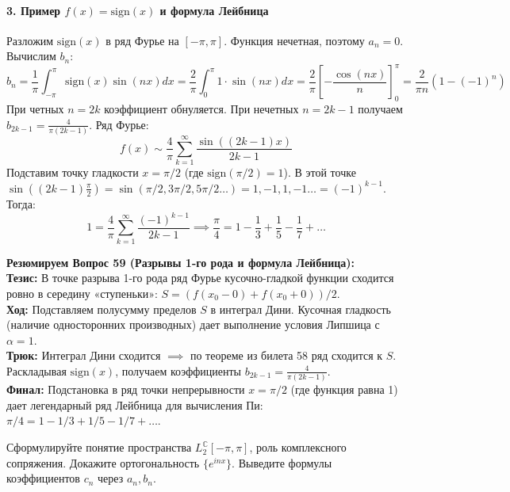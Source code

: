 \paragraph{3. Пример $f(x) = \text{sign}(x)$ и формула Лейбница}
Разложим $\text{sign}(x)$ в ряд Фурье на $[-\pi, \pi]$. Функция нечетная, поэтому $a_n = 0$.
Вычислим $b_n$:
$$ b_n = \frac{1}{\pi} \int_{-\pi}^\pi \text{sign}(x) \sin(nx) dx = \frac{2}{\pi} \int_0^\pi 1 \cdot \sin(nx) dx = \frac{2}{\pi} \left[ -\frac{\cos(nx)}{n} \right]_0^\pi = \frac{2}{\pi n} (1 - (-1)^n) $$
При четных $n=2k$ коэффициент обнуляется. При нечетных $n=2k-1$ получаем $b_{2k-1} = \frac{4}{\pi(2k-1)}$.
Ряд Фурье:
$$ f(x) \sim \frac{4}{\pi} \sum_{k=1}^\infty \frac{\sin((2k-1)x)}{2k-1} $$
Подставим точку гладкости $x = \pi/2$ (где $\text{sign}(\pi/2) = 1$). 
В этой точке $\sin\left((2k-1)\frac{\pi}{2}\right) = \sin(\pi/2, 3\pi/2, 5\pi/2 \dots) = 1, -1, 1, -1 \dots = (-1)^{k-1}$.
Тогда:
$$ 1 = \frac{4}{\pi} \sum_{k=1}^\infty \frac{(-1)^{k-1}}{2k-1} \implies \frac{\pi}{4} = 1 - \frac{1}{3} + \frac{1}{5} - \frac{1}{7} + \dots $$
\begin{tcolorbox}[colback=gray!5, colframe=black, boxrule=0.5pt, arc=0pt]
\textbf{Резюмируем Вопрос 59 (Разрывы 1-го рода и формула Лейбница):} \\
\textbf{Тезис:} В точке разрыва 1-го рода ряд Фурье кусочно-гладкой функции сходится ровно в середину «ступеньки»: $S = (f(x_0-0) + f(x_0+0))/2$. \\
\textbf{Ход:} Подставляем полусумму пределов $S$ в интеграл Дини. Кусочная гладкость (наличие односторонних производных) дает выполнение условия Липшица с $\alpha=1$. \\
\textbf{Трюк:} Интеграл Дини сходится $\implies$ по теореме из билета 58 ряд сходится к $S$. Раскладывая $\text{sign}(x)$, получаем коэффициенты $b_{2k-1} = \frac{4}{\pi(2k-1)}$. \\
\textbf{Финал:} Подстановка в ряд точки непрерывности $x=\pi/2$ (где функция равна 1) дает легендарный ряд Лейбница для вычисления Пи: $\pi/4 = 1 - 1/3 + 1/5 - 1/7 + \dots$.
\end{tcolorbox}

{Сформулируйте понятие пространства $L_{2}^{\mathbb{C}}[-\pi,\pi]$, роль комплексного сопряжения. Докажите ортогональность $\{e^{inx}\}$. Выведите формулы коэффициентов $c_{n}$ через $a_n, b_n$.}

